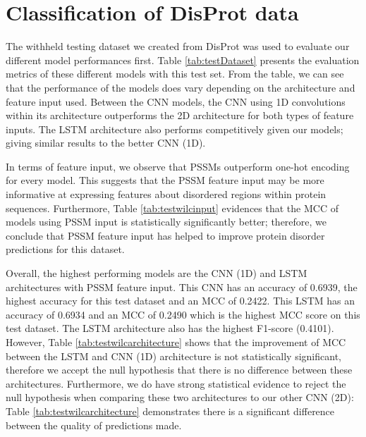 \documentclass{l4proj}
\begin{document}
\section{Classification of DisProt data}
\label{chap:eval sec:test}

The withheld testing dataset we created from DisProt \citep{disprot} was used to evaluate our different model performances first. Table \ref{tab:testDataset} presents the evaluation metrics of these different models with this test set. From the table, we can see that the performance of the models does vary depending on the architecture and feature input used. Between the CNN models, the CNN using 1D convolutions within its architecture outperforms the 2D architecture for both types of feature inputs. The LSTM architecture also performs competitively given our models; giving similar results to the better CNN (1D).

In terms of feature input, we observe that PSSMs outperform one-hot encoding for every model. This suggests that the PSSM feature input may be more informative at expressing features about disordered regions within protein sequences. Furthermore, Table \ref{tab:testwilcinput} evidences that the MCC of models using PSSM input is statistically significantly better; therefore, we conclude that PSSM feature input has helped to improve protein disorder predictions for this dataset.

Overall, the highest performing models are the CNN (1D) and LSTM architectures with PSSM feature input. This CNN has an accuracy of 0.6939, the highest accuracy for this test dataset and an MCC of 0.2422. This LSTM has an accuracy of 0.6934 and an MCC of 0.2490 which is the highest MCC score on this test dataset. The LSTM architecture also has the highest F1-score (0.4101). However, Table \ref{tab:testwilcarchitecture} shows that the improvement of MCC between the LSTM and CNN (1D) architecture is not statistically significant, therefore we accept the null hypothesis that there is no difference between these architectures. Furthermore, we do have strong statistical evidence to reject the null hypothesis when comparing these two architectures to our other CNN (2D): Table \ref{tab:testwilcarchitecture} demonstrates there is a significant difference between the quality of predictions made.
\end{document}
